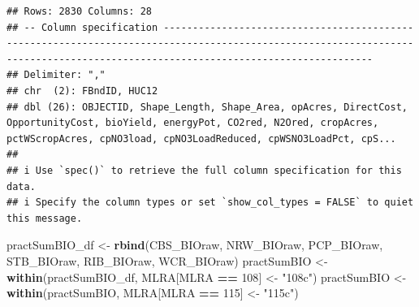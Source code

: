 \documentclass[
]{article}
\newenvironment{Shaded}{\begin{snugshade}}{\end{snugshade}}
\newcommand{\DecValTok}[1]{\textcolor[rgb]{0.00,0.00,0.81}{#1}}
\newcommand{\FunctionTok}[1]{\textcolor[rgb]{0.13,0.29,0.53}{\textbf{#1}}}
\newcommand{\NormalTok}[1]{#1}
\newcommand{\OtherTok}[1]{\textcolor[rgb]{0.56,0.35,0.01}{#1}}
\newcommand{\SpecialCharTok}[1]{\textcolor[rgb]{0.81,0.36,0.00}{\textbf{#1}}}
\newcommand{\StringTok}[1]{\textcolor[rgb]{0.31,0.60,0.02}{#1}}
\begin{document}
\begin{verbatim}
## Rows: 2830 Columns: 28
## -- Column specification --------------------------------------------------------------------------------------------------------------------------------------------------------------------------------
## Delimiter: ","
## chr  (2): FBndID, HUC12
## dbl (26): OBJECTID, Shape_Length, Shape_Area, opAcres, DirectCost, OpportunityCost, bioYield, energyPot, CO2red, N2Ored, cropAcres, pctWScropAcres, cpNO3load, cpNO3LoadReduced, cpWSNO3LoadPct, cpS...
## 
## i Use `spec()` to retrieve the full column specification for this data.
## i Specify the column types or set `show_col_types = FALSE` to quiet this message.
\end{verbatim}

\begin{Shaded}
\begin{Highlighting}[]
\NormalTok{practSumBIO\_df }\OtherTok{\textless{}{-}} \FunctionTok{rbind}\NormalTok{(CBS\_BIOraw, NRW\_BIOraw, PCP\_BIOraw, STB\_BIOraw, RIB\_BIOraw, WCR\_BIOraw)}
\NormalTok{practSumBIO }\OtherTok{\textless{}{-}} \FunctionTok{within}\NormalTok{(practSumBIO\_df, MLRA[MLRA }\SpecialCharTok{==} \DecValTok{108}\NormalTok{] }\OtherTok{\textless{}{-}} \StringTok{"108c"}\NormalTok{)}
\NormalTok{practSumBIO }\OtherTok{\textless{}{-}} \FunctionTok{within}\NormalTok{(practSumBIO, MLRA[MLRA }\SpecialCharTok{==} \DecValTok{115}\NormalTok{] }\OtherTok{\textless{}{-}} \StringTok{"115c"}\NormalTok{)}


\end{Highlighting}
\end{Shaded}
\end{document}
